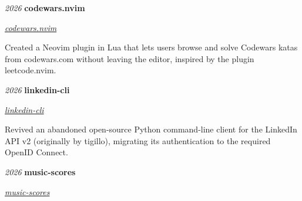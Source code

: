 \documentclass{cv}
\begin{document}
        \vspace{0.13 cm}

        \begin{twocolentry}{
        \textit{2026}}
            \textbf{codewars.nvim}

            \textit{\href{https://github.com/prosk-sudo/codewars.nvim}{codewars.nvim}}
        \end{twocolentry}

        \vspace{0.10 cm}
        \begin{onecolentry}
            \begin{highlights}
                \item Created a Neovim plugin in Lua that lets users browse and solve Codewars katas from codewars.com without leaving the editor, inspired by the plugin leetcode.nvim.
            \end{highlights}
        \end{onecolentry}

        \vspace{0.13 cm}

        \begin{twocolentry}{
        \textit{2026}}
            \textbf{linkedin-cli}

            \textit{\href{https://github.com/prosk-sudo/linkedin-cli}{linkedin-cli}}
        \end{twocolentry}

        \vspace{0.10 cm}
        \begin{onecolentry}
            \begin{highlights}
                \item Revived an abandoned open-source Python command-line client for the LinkedIn API v2 (originally by tigillo), migrating its authentication to the required OpenID Connect.
            \end{highlights}
        \end{onecolentry}

        \vspace{0.13 cm}

        \begin{twocolentry}{
        \textit{2026}}
            \textbf{music-scores}

            \textit{\href{https://github.com/prosk-sudo/music-scores}{music-scores}}
        \end{twocolentry}
\end{document}
